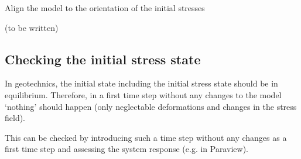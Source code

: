 Align the model to the orientation of the initial stresses

(to be written)

\subsection{Checking the initial stress state}
\label{chap:IC-check}

In geotechnics, the initial state including the initial stress state should be
in equilibrium. Therefore, in a first time step without any changes to the
model ‘nothing’ should happen (only neglectable deformations and changes in the
stress field).

This can be checked by introducing such a time step without any changes as a
first time step and assessing the system response (e.g. in Paraview).
